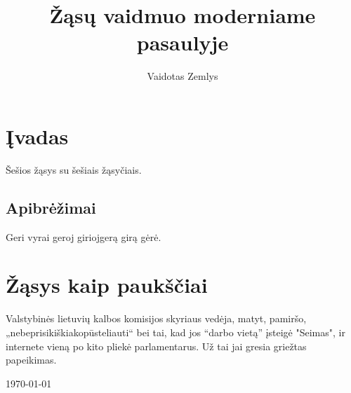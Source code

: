 \documentclass{article}
\begin{document}
\author{Vaidotas Zemlys}
\title{Žąsų vaidmuo moderniame pasaulyje}
\maketitle
\thispagestyle{empty}

\tableofcontents
\section{Įvadas}
Šešios žąsys su šešiais žąsyčiais.
\subsection{Apibrėžimai}
Geri vyrai geroj girioj\newline gerą girą gėrė.
\section{Žąsys kaip paukščiai}
Valstybinės lietuvių kalbos komisijos skyriaus vedėja, matyt, pamiršo, „nebeprisikiškiakopūsteliauti“ bei tai, kad jos ``darbo vietą'' įsteigė "Seimas", ir internete vieną po kito pliekė parlamentarus. Už tai jai gresia griežtas papeikimas.


\today
\end{document}
